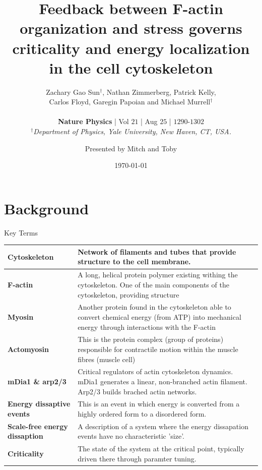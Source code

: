 \documentclass[aspectratio=169]{beamer}
\author{Presented by Mitch and Toby}
\title{Feedback  between F-actin organization and stress governs criticality and energy localization in the cell cytoskeleton}
\subtitle{
    Zachary Gao Sun$^\dagger$, Nathan Zimmerberg, Patrick Kelly, \\ Carlos Floyd, Garegin Papoian and Michael Murrell$^\dagger$ \\ \quad \\
    \textbf{Nature Physics} | Vol $21$ | Aug $25$ | $1290$-$1302$ \\
    $^\dagger$\textit{Department of Physics, Yale University, New Haven, CT, USA.}
}
\date{\today}
\begin{document}
	\begin{frame}[plain]
		\titlepage
	\end{frame}


    \section{Background}

    \begin{frame}[allowframebreaks]{Key Terms}
        \begin{longtable}{m{4cm}|m{9cm}}
            \hline
            \textbf{Cytoskeleton} & Network of filaments and tubes that provide structure to the cell membrane. \vspace{0.2cm}\\
            \hline  
            \textbf{F-actin} & A long, helical protein polymer existing withing the cytoskeleton. One of the main components of the cytoskeleton, providing structure \vspace{0.2cm}\\
            \hline
            \textbf{Myosin} & Another protein found in the cytoskeleton able to convert chemical energy (from ATP) into mechanical energy through interactions with the F-actin \vspace{0.2cm}\\
            \hline
            \textbf{Actomyosin} & This is the protein complex (group of proteins) responsible for contractile motion within the muscle fibres (muscle cell) \vspace{0.2cm}\\
            \hline
            \textbf{mDia1 \& arp2/3} & Critical regulators of actin cytoskeleton dynamics. mDia1 generates a linear, non-branched actin filament. Arp2/3 builds brached actin networks.  \vspace{0.2cm}\\
            \hline
            \textbf{Energy dissaptive events} & This is an event in which energy is converted from a highly ordered form to a disordered form. \vspace{0.2cm}\\
            \hline
            \textbf{Scale-free energy dissaption} & A description of a system where the energy dissapation events have no characteristic 'size'. \vspace{0.2cm}\\
            \hline
            \textbf{Criticality} & The state of the system at the critical point, typically driven there through paramter tuning. \vspace{0.2cm}
        \end{longtable}
    \end{frame}
\end{document}
